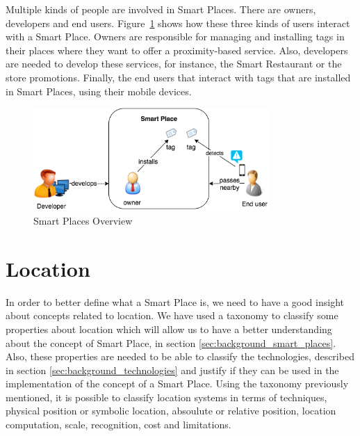 Multiple kinds of people are involved in Smart Places.
There are owners, developers and end users.
Figure~\ref{fig:smart_places_overview} shows how these three kinds of users interact with a Smart Place.
Owners are responsible for managing and installing tags in their places where they want to offer a proximity-based service.
Also, developers are needed to develop these services, for instance, the Smart Restaurant or the store promotions.
Finally, the end users that interact with tags that are installed in Smart Places, using their mobile devices.

\begin{figure}[!ht]
  \centering
    \includegraphics[width=0.8\textwidth, keepaspectratio]{images/smart_places_overview}
    \caption[Smart Places Overview]{Smart Places Overview}
    \label{fig:smart_places_overview}
\end{figure}

\section{Location}
\label{sec:background_location}
In order to better define what a Smart Place is, we need to have a good insight about concepts related to location.
We have used a taxonomy\cite{location} to classify some properties about location which will allow us to have a better understanding about the concept of Smart Place, in section \ref{sec:background_smart_places}.
Also, these properties are needed to be able to classify the technologies, described in section \ref{sec:background_technologies} and justify if they can be used in the implementation of the concept of a Smart Place.
Using the taxonomy previously mentioned, it is possible to classify location systems in terms of techniques, physical position or symbolic location, absoulute or relative position, location computation, scale, recognition, cost and limitations.

